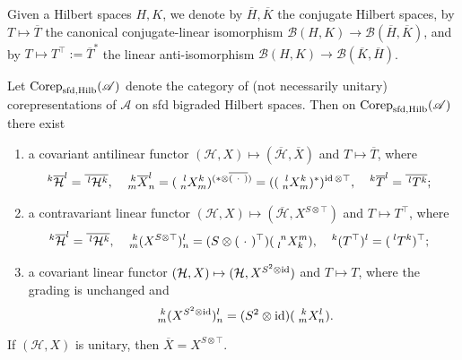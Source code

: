 Given a Hilbert spaces $H,K$, we denote by $\overline{H},\overline{K}$
the conjugate Hilbert spaces, by $T \mapsto \overline{T}$ the
canonical conjugate-linear isomorphism $\mathcal{B}(H,K) \to
\mathcal{B}(\overline{H},\overline{K})$, and by $T \mapsto
T^{\top}:=\overline{T}^{*}$ the linear anti-isomorphism %
$\mathcal{B}(H,K) \to \mathcal{B}(\overline{K},\overline{H})$.

\begin{Lem} \label{lemma:rep-functors}Let $\Corep_{\sfd,\Hilb}(\mathscr{A})$ denote the category of (not necessarily unitary) corepresentations of $\mathscr{A}$ on sfd bigraded Hilbert spaces. 
   Then on $\Corep_{\sfd,\Hilb}(\mathscr{A})$ there exist
  \begin{enumerate}
  \item a covariant antilinear functor $(\mathcal{H},X) \mapsto
    (\overline{\mathcal{H}},\overline{X})$ and $T \mapsto
    \overline{T}$, where
    \begin{align*}
      \Gru{\overline{\mathcal{H}}}{k}{l} &= \overline{\Gru{\mathcal{H}}{l}{k}},
      & \Gr{\overline{X}}{k}{l}{m}{n} &= (\Gr{X}{l}{k}{n}{m})^{(*
        \otimes \overline{(\ \cdot \ ) })}
      =((\Gr{X}{l}{k}{n}{m})^{*})^{\id \otimes \top}, &
      \Gru{\overline{T}}{k}{l} &= \overline{\Gru{T}{l}{k}};
    \end{align*}
  \item a contravariant linear functor $(\mathcal{H},X) \mapsto
    (\overline{\mathcal{H}},X^{S\otimes \top})$ and
    $T\mapsto T^{\top}$, where 
    \begin{align*}\Gru{\overline{\mathcal{H}}}{k}{l} &= \overline{\Gru{\mathcal{H}}{l}{k}},&
     & \Gr{(X^{S\otimes \top})}{k}{l}{m}{n} = (S \otimes (\ \cdot \
      )^{\top})(\Gr{X}{n}{m}{l}{k}), & \Gru{(T^{\top})}{k}{l}
      &=(\Gru{T}{l}{k})^{\top};
    \end{align*}
  \item a covariant linear functor  $(\mathcal{H},X) \mapsto (\mathcal{H},X^{S^{2}\otimes \id})$
    and $T\mapsto T$, where the grading is unchanged and \[\Gr{(X^{S^{2}\otimes \id})}{k}{l}{m}{n}=(S^{2} \otimes
  \id)(\Gr{X}{k}{l}{m}{n}).\]
  \end{enumerate}
  If $(\mathcal{H},X)$ is unitary, then $\overline{X}=X^{S\otimes \top}$.\end{Lem}
